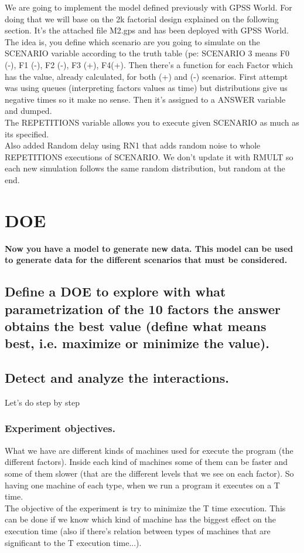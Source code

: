 \documentclass[12pt]{article}
\begin{document}
\hfill%
\begin{minipage}{0.6\textwidth}\raggedright
We are going to implement the model defined previously with GPSS World. For doing that we will base on the 2k factorial design explained on the following section. It's the attached file M2.gps and has been deployed with GPSS World.\\
The idea is, you define which scenario are you going to simulate on the SCENARIO variable according to the truth table (pe: SCENARIO 3 means F0 (-), F1 (-), F2 (-), F3 (+), F4(+). Then there's a function for each Factor which has the value, already calculated, for both (+) and (-) scenarios. First attempt was using queues (interpreting factors values as time) but distributions give us negative times so it make no sense. Then it's assigned to a ANSWER variable and dumped.\\
The REPETITIONS variable allows you to execute given SCENARIO as much as its specified.\\
Also added Random delay using RN1 that adds random noise to whole REPETITIONS executions of SCENARIO. We don't update it with RMULT so each new simulation follows the same random distribution, but random at the end.
\end{minipage}


\section {DOE}
\vspace{5mm}
\textbf{Now you have a model to generate new data. This model can be used to generate data for the different scenarios that must be considered.}
\subsection {Define a DOE to explore with what parametrization of the 10 factors the answer obtains the best value (define what means best, i.e. maximize or minimize the value).}
\subsection {Detect and analyze the interactions.}
Let's do step by step

\subsubsection{Experiment objectives.}
What we have are different kinds of machines used for execute the program (the different factors). Inside each kind of machines some of them can be faster and some of them slower (that are the different levels that we see on each factor). So having one machine of each type, when we run a program it executes on a T time.\\
The objective of the experiment is try to minimize the T time execution. This can be done if we know which kind of machine has the biggest effect on the execution time (also if there's relation between types of machines that are significant to the T execution time...).
\end{document}
